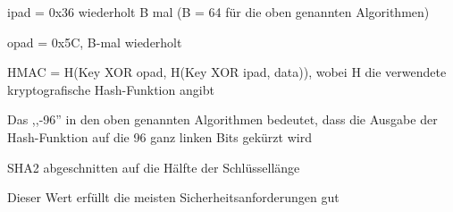 \documentclass[a4paper]{article}
\begin{document}
\begin{multicols}{3}
\begin{itemize*}
\begin{itemize*}
                  \begin{itemize*}
                        \item ipad = 0x36 wiederholt B mal (B = 64 für die oben genannten Algorithmen)
                        \item opad = 0x5C, B-mal wiederholt
                        \item HMAC = H(Key XOR opad, H(Key XOR ipad, data)), wobei H die verwendete kryptografische Hash-Funktion angibt
                  \end{itemize*}
                  \item Das ,,-96'' in den oben genannten Algorithmen bedeutet, dass die Ausgabe der Hash-Funktion auf die 96 ganz linken Bits gekürzt wird
                  \item SHA2 abgeschnitten auf die Hälfte der Schlüssellänge
                  \item Dieser Wert erfüllt die meisten Sicherheitsanforderungen gut
            \end{itemize*}
      \end{itemize*}


\end{multicols}
\end{document}
